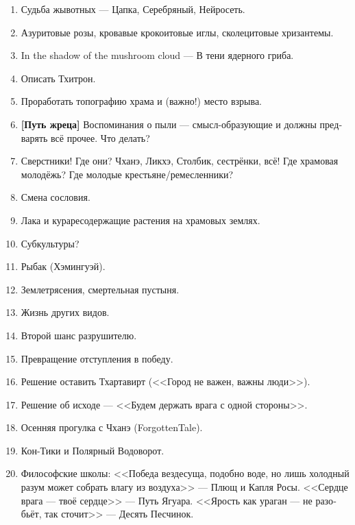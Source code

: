 \documentclass[a4paper,12pt,fleqn]{book}\usepackage{polyglossia}\setdefaultlanguage[babelshorthands=true]{russian}\setotherlanguage{english}\defaultfontfeatures{Ligatures=TeX,Mapping=tex-text}\usepackage{xcolor}\newcommand{\ml}[3]{#2}
\begin{document}
{\begin{enumerate}
\item Судьба жывотных --- Цапка, Серебряный, Нейросеть.

\item Азуритовые розы, кровавые крокоитовые иглы, сколецитовые хризантемы.

\item In the shadow of the mushroom cloud --- В тени ядерного гриба.

\item Описать Тхитрон.

\item Проработать топографию храма и (важно!) место взрыва.

\item \textbf{[Путь жреца]} Воспоминания о пыли --- смысл-образующие и должны предварять всё прочее.
Что делать?

\item Сверстники!
Где они?
Чханэ, Ликхэ, Столбик, сестрёнки, всё!
Где храмовая молодёжь?
Где молодые крестьяне/ремесленники?

\item Смена сословия.

\item Лака и кураресодержащие растения на храмовых землях.

\item Субкультуры?

\item Рыбак (Хэмингуэй).

\item Землетрясения, смертельная пустыня.

\item Жизнь других видов.

\item Второй шанс разрушителю.

\item Превращение отступления в победу.

\item Решение оставить Тхартавирт (<<Город не важен, важны люди>>).

\item Решение об исходе --- <<Будем держать врага с одной стороны>>.

\item Осенняя прогулка с Чханэ (ForgottenTale).

\item Кон-Тики и Полярный Водоворот.

\item Философские школы: <<Победа вездесуща, подобно воде, но лишь холодный разум может собрать влагу из воздуха>> --- Плющ и Капля Росы.
<<Сердце врага --- твоё сердце>> --- Путь Ягуара.
<<Ярость как ураган --- не разобьёт, так сточит>> --- Десять Песчинок.


\end{enumerate}}
\end{document}
